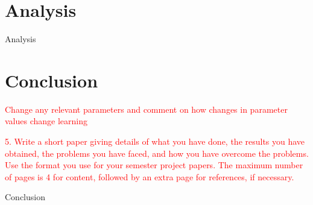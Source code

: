 \documentclass[letterpaper]{article}
\begin{document}
\section{Analysis}


\indent Analysis
 
\section{Conclusion}

\textcolor{red}{ Change any relevant parameters and comment on how changes in parameter values change learning}

\textcolor{red}{ 5. Write a short paper giving details of what you have done, the results you have obtained, the problems you have faced, and how you have overcome the problems. Use the format you use for your semester project papers. The maximum number of pages is 4 for content, followed by an extra page for references, if necessary.}

\indent Conclusion 


\end{document}
